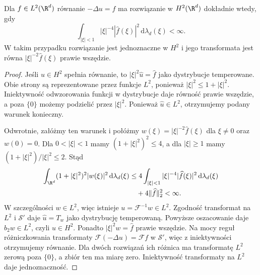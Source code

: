 \begin{stwierdzenie}
Dla $f\in L^2(\R^d)$ równanie $-\Delta u=f$
ma rozwiązanie w $H^2(\R^d)$ dokładnie wtedy, gdy
\[
 \int_{|\xi|<1}|\xi|^{-4}|\widehat f(\xi)|^2
 \,\mathrm d\lambda_d(\xi)<\infty.
\]
W takim przypadku rozwiązanie jest jednoznaczne
w $H^2$ i jego transformata jest równa
$|\xi|^{-2}\widehat f(\xi)$ prawie wszędzie.
\end{stwierdzenie}
\begin{proof}
Jeśli $u\in H^2$ spełnia równanie, to
$|\xi|^2\widehat u=\widehat f$
jako dystrybucje temperowane. Obie strony
są reprezentowane przez funkcje $L^2$,
ponieważ $|\xi|^2\le1+|\xi|^2$.
Iniektywność odwzorowania funkcji w dystrybucje
daje równość prawie wszędzie, a poza $\{0\}$
możemy podzielić przez $|\xi|^2$.
Ponieważ $\widehat u\in L^2$, otrzymujemy
podany warunek konieczny.

Odwrotnie, załóżmy ten warunek i połóżmy
$w(\xi)=|\xi|^{-2}\widehat f(\xi)$
dla $\xi\ne0$ oraz $w(0)=0$.
Dla $0<|\xi|<1$ mamy
$(1+|\xi|^2)^2\le4$, a dla $|\xi|\ge1$
mamy $(1+|\xi|^2)/|\xi|^2\le2$.
Stąd
\[
 \begin{aligned}
 \int_{\R^d}(1+|\xi|^2)^2|w(\xi)|^2
 \,\mathrm d\lambda_d(\xi)
 &\le4\int_{|\xi|<1}|\xi|^{-4}|\widehat f(\xi)|^2
 \,\mathrm d\lambda_d(\xi)\\
 &\quad+4\|\widehat f\|_2^2<\infty.
 \end{aligned}
\]
W szczególności $w\in L^2$, więc istnieje
$u=\mathcal F^{-1}w\in L^2$. Zgodność
transformat na $L^2$ i $\mathcal S'$ daje
$\widehat u=T_w$ jako dystrybucję temperowaną.
Powyższe oszacowanie daje $b_2w\in L^2$,
czyli $u\in H^2$. Ponadto
$|\xi|^2 w=\widehat f$ prawie wszędzie.
Na mocy reguł różniczkowania transformaty
$\mathcal F(-\Delta u)=\mathcal Ff$ w $\mathcal S'$,
więc z iniektywności otrzymujemy równanie.
Dla dwóch rozwiązań ich różnica ma transformatę
$L^2$ zerową poza $\{0\}$, a zbiór ten ma
miarę zero. Iniektywność transformaty na $L^2$
daje jednoznaczność.
\end{proof}

